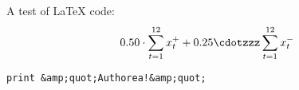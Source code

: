 A test of LaTeX code: \[ 0.50 \cdot \sum_{t = 1}^{12} x_t^+ + 0.25 \cdotzzz \sum_{t = 1}^{12} x_t^- \] 

\verb|print &amp;quot;Authorea!&amp;quot;|
  
  
  